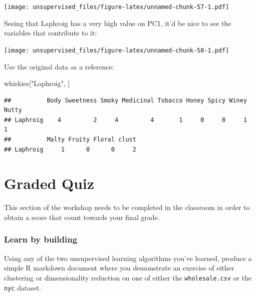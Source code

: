 \documentclass[]{article}
\newenvironment{Shaded}{\begin{snugshade}}{\end{snugshade}}
\newcommand{\DataTypeTok}[1]{\textcolor[rgb]{0.13,0.29,0.53}{#1}}
\newcommand{\KeywordTok}[1]{\textcolor[rgb]{0.13,0.29,0.53}{\textbf{#1}}}
\newcommand{\NormalTok}[1]{#1}
\newcommand{\OperatorTok}[1]{\textcolor[rgb]{0.81,0.36,0.00}{\textbf{#1}}}
\newcommand{\StringTok}[1]{\textcolor[rgb]{0.31,0.60,0.02}{#1}}
\begin{document}
\texttt{[image: unsupervised\_files/figure-latex/unnamed-chunk-57-1.pdf]}

Seeing that Laphroig has a very high value on PC1, it'd be nice to see
the variables that contribute to it:

\begin{Shaded}
\end{Shaded}

\texttt{[image: unsupervised\_files/figure-latex/unnamed-chunk-58-1.pdf]}

Use the original data as a reference:

\begin{Shaded}
\begin{Highlighting}[]
\NormalTok{whiskies[}\StringTok{"Laphroig"}\NormalTok{, ]}
\end{Highlighting}
\end{Shaded}

\begin{verbatim}
##          Body Sweetness Smoky Medicinal Tobacco Honey Spicy Winey Nutty
## Laphroig    4         2     4         4       1     0     0     1     1
##          Malty Fruity Floral clust
## Laphroig     1      0      0     2
\end{verbatim}

\hypertarget{graded-quiz}{%
\section{Graded Quiz}\label{graded-quiz}}

This section of the workshop needs to be completed in the classroom in
order to obtain a score that count towards your final grade.

\hypertarget{learn-by-building}{%
\subsubsection{Learn by building}\label{learn-by-building}}

Using any of the two unsupervised learning algorithms you've learned,
produce a simple R markdown document where you demonstrate an exercise
of either clustering or dimensionality reduction on one of either the
\texttt{wholesale.csv} or the \texttt{nyc} dataset.
\end{document}
